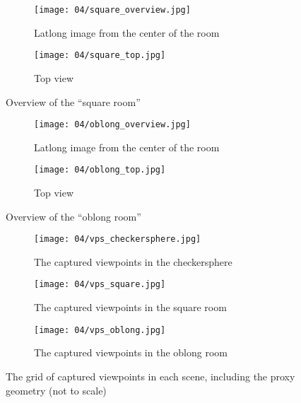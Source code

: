 \begin{figure}[p]
\centering
    \hfill
    \begin{subfigure}[b]{0.7\textwidth}
            \centering
            \texttt{[image: 04/square\_overview.jpg]}
            \caption{Latlong image from the center of the room}
    \end{subfigure}%
    \hfill
    \begin{subfigure}[b]{0.3\textwidth}
            \centering
            \texttt{[image: 04/square\_top.jpg]}
            \caption{Top view}
    \end{subfigure}
    \hfill
  \caption{Overview of the ``square room''}
  \label{fig:square_room}
\end{figure}

\begin{figure}[p]
\centering
    \hfill
    \begin{subfigure}[b]{0.7\textwidth}
            \centering
            \texttt{[image: 04/oblong\_overview.jpg]}
            \caption{Latlong image from the center of the room}
    \end{subfigure}%
    \hfill
    \begin{subfigure}[b]{0.3\textwidth}
            \centering
            \texttt{[image: 04/oblong\_top.jpg]}
            \caption{Top view}
    \end{subfigure}
    \hfill
  \caption{Overview of the ``oblong room''}
  \label{fig:oblong_room}
\end{figure}

\begin{figure}
\centering
    \hfill
    \begin{subfigure}[b]{0.4\textwidth}
            \centering
            \texttt{[image: 04/vps\_checkersphere.jpg]}
            \caption{The captured viewpoints in the checkersphere}
    \end{subfigure}
    \hfill
    \begin{subfigure}[b]{0.4\textwidth}
            \centering
            \texttt{[image: 04/vps\_square.jpg]}
            \caption{The captured viewpoints in the square room}
    \end{subfigure}
    \hfill
    \hfill

    \hfill
    \begin{subfigure}[b]{0.4\textwidth}
            \centering
            \texttt{[image: 04/vps\_oblong.jpg]}
            \caption{The captured viewpoints in the oblong room}
    \end{subfigure}
    \hfill
    \hfill
  \caption[The grid of captured viewpoints in each scene, including the proxy geometry]{The grid of captured viewpoints in each scene, including the proxy geometry (not to scale)} \label{fig:vps_grid}
\end{figure}

